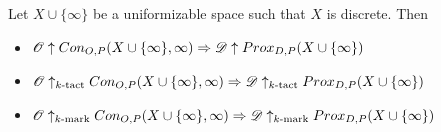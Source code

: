 



\begin{theorem}
  Let $X\cup\{\infty\}$ be a uniformizable space such that $X$ is discrete. Then
  \begin{itemize}
    \item
      $\mathscr{O}\uparrow Con_{O,P}(X\cup\{\infty\},\infty) \Rightarrow \mathscr{D} \uparrow Prox_{D,P}(X\cup\{\infty\})$
    \item
      $\mathscr{O}\uparrow_{k\text{-tact}} Con_{O,P}(X\cup\{\infty\},\infty) \Rightarrow \mathscr{D} \uparrow_{k\text{-tact}} Prox_{D,P}(X\cup\{\infty\})$
    \item
      $\mathscr{O}\uparrow_{k\text{-mark}} Con_{O,P}(X\cup\{\infty\},\infty) \Rightarrow \mathscr{D} \uparrow_{k\text{-mark}} Prox_{D,P}(X\cup\{\infty\})$
  \end{itemize}
\end{theorem}


